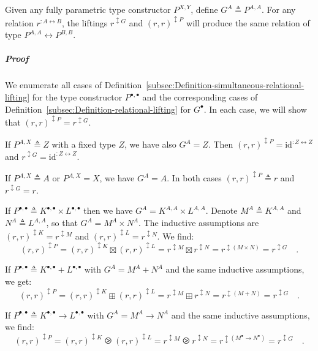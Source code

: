 Given any fully parametric type constructor $P^{X,Y}$, define $G^{A}\triangleq P^{A,A}$.
For any relation $r^{:A\leftrightarrow B}$, the liftings $r^{\updownarrow G}$
and $\left(r,r\right)^{\updownarrow P}$ will produce the same relation
of type $P^{A,A}\leftrightarrow P^{B,B}$.

\subparagraph{Proof}

We enumerate all cases of Definition~\ref{subsec:Definition-simultaneous-relational-lifting}
for the type constructor $P^{\bullet,\bullet}$ and the corresponding
cases of Definition~\ref{subsec:Definition-relational-lifting} for
$G^{\bullet}$. In each case, we will show that $(r,r)^{\updownarrow P}=r^{\updownarrow G}$.

If $P^{A,X}\triangleq Z$ with a fixed type $Z$, we have also $G^{A}=Z$.
Then $(r,r)^{\updownarrow P}=\text{id}^{:Z\leftrightarrow Z}$ and
$r^{\updownarrow G}=\text{id}^{:Z\leftrightarrow Z}$.

If $P^{A,X}\triangleq A$ or $P^{A,X}=X$, we have $G^{A}=A$. In
both cases $(r,r)^{\updownarrow P}\triangleq r$ and $r^{\updownarrow G}=r$.

If $P^{\bullet,\bullet}\triangleq K^{\bullet,\bullet}\times L^{\bullet,\bullet}$
then we have $G^{A}=K^{A,A}\times L^{A,A}$. Denote $M^{A}\triangleq K^{A,A}$
and $N^{A}\triangleq L^{A,A}$, so that $G^{A}=M^{A}\times N^{A}$.
The inductive assumptions are $(r,r)^{\updownarrow K}=r^{\updownarrow M}$
and $(r,r)^{\updownarrow L}=r^{\updownarrow N}$. We find:
\[
(r,r)^{\updownarrow P}=(r,r)^{\updownarrow K}\boxtimes(r,r)^{\updownarrow L}=r^{\updownarrow M}\boxtimes r^{\updownarrow N}=r^{\updownarrow(M\times N)}=r^{\updownarrow G}\quad.
\]

If $P^{\bullet,\bullet}\triangleq K^{\bullet,\bullet}+L^{\bullet,\bullet}$
with $G^{A}=M^{A}+N^{A}$ and the same inductive assumptions, we get:
\[
(r,r)^{\updownarrow P}=(r,r)^{\updownarrow K}\boxplus(r,r)^{\updownarrow L}=r^{\updownarrow M}\boxplus r^{\updownarrow N}=r^{\updownarrow(M+N)}=r^{\updownarrow G}\quad.
\]

If $P^{\bullet,\bullet}\triangleq K^{\bullet,\bullet}\rightarrow L^{\bullet,\bullet}$
with $G^{A}=M^{A}\rightarrow N^{A}$ and the same inductive assumptions,
we find: 
\[
(r,r)^{\updownarrow P}=(r,r)^{\updownarrow K}\ogreaterthan(r,r)^{\updownarrow L}=r^{\updownarrow M}\ogreaterthan r^{\updownarrow N}=r^{\updownarrow(M^{\bullet}\rightarrow N^{\bullet})}=r^{\updownarrow G}\quad.
\]

